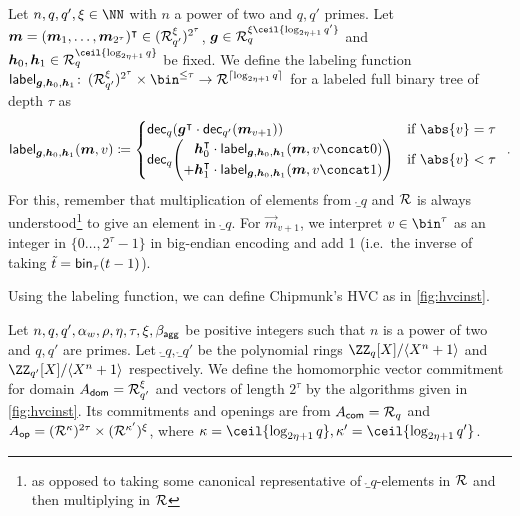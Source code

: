 \begin{definition}\label{def:label}
  Let $n,q,q',\xi\in\NN$ with $n$ a power of two and $q,q'$ primes.
  Let $\boldsymbol{m}=(\boldsymbol{m}_{1},\dots,\boldsymbol{m}_{{2^{\tau}}})^\intercal\in(\mathcal{R}_{q'}^\xi)^{2^{\tau}}$, $\vec{g} \in \ring_{q}^{\xi\ceil{\log_{2\eta+1} q'}}$ and $\vec{h}_0,\vec{h}_1 \in \ring_q^{\ceil{\log_{2\eta+1} q}}$ be fixed.
  We define the labeling function
  $\lbl_{\vec{g},\vec{h}_0,\vec{h}_1}\colon\,
  (\ring^\xi_{q'})^{2^{\tau}}\times \bin^{\leq \tau} \to \ring^{\lceil \log_{2\eta+1} q \rceil}$
  for a labeled full binary tree of depth $\tau$ as
  \[
    \lbl_{\vec{g},\vec{h}_0,\vec{h}_1}(\vec{m},v) \coloneqq 
      \begin{cases}
          \decompmod{q}(\vec{g}^\transpose\cdot \decompmod{q'}(\vec{m}_{v+1})) & \text{if } \abs{v}=\tau\\ \decompmod{q}\mleft(
              \begin{aligned}
                 \vec{h}_0^\transpose \cdot\lbl_{\vec{g},\vec{h}_0,\vec{h}_1}(\vec{m},v\concat 0)\\
               + \vec{h}_1^\transpose \cdot\lbl_{\vec{g},\vec{h}_0,\vec{h}_1}(\vec{m},v\concat 1)
               \end{aligned}
              \mright)& \text{if } \abs{v}< \tau
      \end{cases}\enspace.
  \]
For this, remember that multiplication of elements from $\ring_q$ and $\mathcal{R}$ is always understood\footnote{as opposed to taking some canonical representative of $\ring_q$-elements in $\mathcal{R}$ and then multiplying in $\mathcal{R}$} to give an element in $\ring_q$. For $\vec{m}_{v+1}$, we interpret $v\in\bin^{\tau}$ as an integer in $\{0\ldots, 2^\tau-1\}$ in big-endian encoding and add 1 (i.e.\ the inverse of taking $\tilde t = \mathsf{bin}_{\tau}(t-1)$).
\end{definition}

Using the labeling function, we can define Chipmunk's HVC as in \autoref{fig:hvcinst}.

\begin{definition}\label{def:hvc_chipmunk_unencoded}
Let $n, q, q', \alpha_w, \rho, \eta, \tau, \xi,\beta_{\mathsf{agg}}$ be positive integers such that $n$ is a power of two and $q,q'$ are primes.
Let $\ring_q,\ring_{q'}$ be the polynomial rings $\defringq$ and $\defringqq$ respectively.
We define the homomorphic vector commitment \eprint{$\hvcplain$}\cameraready{$\hvccamera$} for domain $A_{\mathsf{dom}} = \mathcal{R}_{q'}^\xi$ and vectors of length $2^\tau$ by the algorithms given in \autoref{fig:hvcinst}.
Its commitments and openings are from $A_{\mathsf{com}} = \mathcal{R}_q$ and $A_{\mathsf{op}} = (\mathcal{R}^\kappa)^{2\tau}\times (\mathcal{R}^{\kappa'})^{\xi}$, where $\limbs = \ceil{\log_{2\eta+1}q}, \limbs' = \ceil{\log_{2\eta+1}q'}$.
\end{definition}

